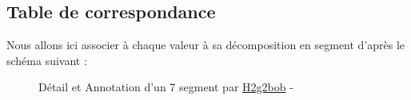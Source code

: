 \documentclass{article}
\begin{document}
    \subsection{Table de correspondance}
    Nous allons ici associer à chaque valeur à sa décomposition en segment d'après le schéma suivant :
    \begin{figure}[H]
        \caption{Détail et Annotation d'un 7 segment par \href{https://commons.wikimedia.org/wiki/User:H2g2bob}{H2g2bob} - \ccLogo\ccAttribution\ccShareAlike}
    \end{figure}
\end{document}
